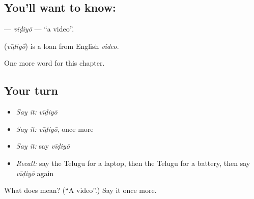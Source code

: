 \subsection*{You'll want to know: }
\textbf{} — \emph{vīḍiyō} — \textquotedblleft{}a video\textquotedblright{}.

\begin{cousinweb}
\textbf{} (\emph{vīḍiyō}) is a loan from English \emph{video}.
\end{cousinweb}

\begin{grammarlens}[title={What you've built}]
One more word for this chapter.
\end{grammarlens}

\subsection*{Your turn}
\begin{itemize}
\raggedright
  \item \emph{Say it:} \emph{vīḍiyō}
  \item \emph{Say it:} \emph{vīḍiyō}, once more
  \item \emph{Say it:} say \emph{vīḍiyō}
  \item \emph{Recall:} say the Telugu for a laptop, then the Telugu for a battery, then say \emph{vīḍiyō} again
\end{itemize}

\begin{tcolorbox}[breakable,colback=teal!4,colframe=teal!35!black,title={Before you move on}]
What does  mean? (\textquotedblleft{}A video\textquotedblright{}.) Say it once more.
\end{tcolorbox}
